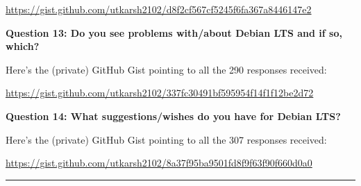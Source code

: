 \documentclass{article}
\begin{document}
\vspace{2mm}
\href{https://gist.github.com/utkarsh2102/d8f2cf567cf5245f6fa367a8446147e2}{https://gist.github.com/utkarsh2102/d8f2cf567cf5245f6fa367a8446147e2}

\vspace{20mm}
\large{\textbf{Question 13: Do you see problems with/about Debian LTS and if so, which?}}

\vspace{3mm}
\large Here's the (private) GitHub Gist pointing to all the 290 responses received:

\vspace{2mm}
\href{https://gist.github.com/utkarsh2102/337fc30491bf595954f14f1f12be2d72}{https://gist.github.com/utkarsh2102/337fc30491bf595954f14f1f12be2d72}

\vspace{20mm}
\large{\textbf{Question 14: What suggestions/wishes do you have for Debian LTS?}}

\vspace{3mm}
\large Here's the (private) GitHub Gist pointing to all the 307 responses received:

\vspace{2mm}
\href{https://gist.github.com/utkarsh2102/8a37f95ba9501fd8f9f63f90f660d0a0}{https://gist.github.com/utkarsh2102/8a37f95ba9501fd8f9f63f90f660d0a0}

\vspace{20mm}
\noindent\rule{16.5cm}{0.4pt}
\end{document}
